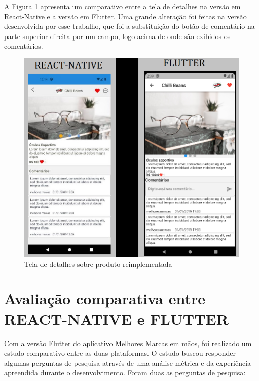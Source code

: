 \documentclass[12pt]{article}
\begin{document}
A Figura \ref{fig:comp2} apresenta um comparativo entre a tela de detalhes na versão em React-Native e a versão em Flutter. Uma grande alteração foi feitas na versão desenvolvida por esse trabalho, que foi a substituição do botão de comentário na parte superior direita por um campo, logo acima de onde são exibidos os comentários.

\begin{figure}[ht!]
\centering
\includegraphics[width=.8\textwidth]{imagens/comparativoDetalhes2.png}
\caption{Tela de detalhes sobre produto reimplementada}
\label{fig:comp2}
\end{figure}


\section{Avaliação comparativa entre REACT-NATIVE e FLUTTER} \label{sec:aval}

Com a versão Flutter do aplicativo Melhores Marcas em mãos, foi realizado um estudo comparativo entre as duas plataformas. O estudo buscou responder algumas perguntas de pesquisa através de uma análise métrica e da experiência apreendida durante o desenvolvimento. Foram duas as perguntas de pesquisa: 
\end{document}
